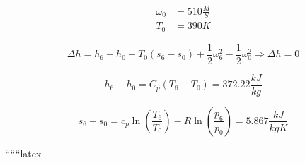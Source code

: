 \begin{align*}
    \omega_0 &= 510 \frac{M}{S} \\
    T_0 &= 390 K
\end{align*}

\[
\Delta h = h_6 - h_0 - T_0 (s_6 - s_0) + \frac{1}{2} \omega_6^2 - \frac{1}{2} \omega_0^2 \Rightarrow \Delta h = 0
\]

\[
h_6 - h_0 = C_p (T_6 - T_0) = 372.22 \frac{kJ}{kg}
\]

\[
s_6 - s_0 = c_p \ln \left( \frac{T_6}{T_0} \right) - R \ln \left( \frac{p_6}{p_0} \right) = 5.867 \frac{kJ}{kgK}
\]

``````latex


